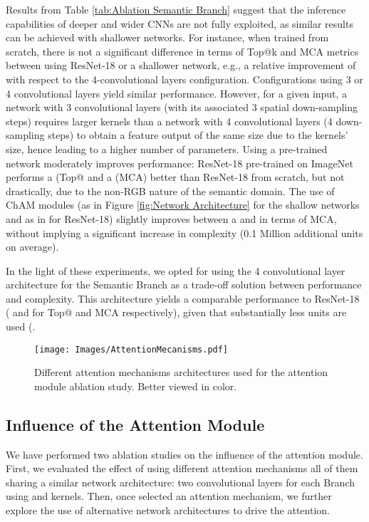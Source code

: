 \documentclass[review, 3p, sort&compress]{elsarticle}
\begin{document}
Results from Table \ref{tab:Ablation Semantic Branch} suggest that the inference capabilities of deeper and wider CNNs are not fully exploited, as similar results can be achieved with shallower networks. For instance, when trained from scratch, there is not a significant difference in terms of Top@k and MCA metrics between using ResNet-18 or a shallower network, e.g., a relative improvement of  with respect to the 4-convolutional layers configuration. Configurations using 3 or 4 convolutional layers yield similar performance. However, for a given input, a network with 3 convolutional layers (with its associated 3 spatial down-sampling steps) requires larger kernels than a network with 4 convolutional layers (4 down-sampling steps) to obtain a feature output of the same size due to the kernels' size, hence leading to a higher number of parameters. Using a pre-trained network moderately improves performance: ResNet-18 pre-trained on ImageNet performs a  (Top@ and a  (MCA) better than ResNet-18 from scratch, but not drastically, due to the non-RGB nature of the semantic domain. The use of ChAM modules (as in Figure \ref{fig:Network Architecture} for the shallow networks and as in \cite{woo2018cbam} for ResNet-18) slightly improves between a  and  in terms of MCA, without implying a significant increase in complexity (0.1 Million additional units on average). 

In the light of these experiments, we opted for using the 4 convolutional layer architecture for the Semantic Branch as a trade-off solution between performance and complexity. This architecture yields a comparable performance to ResNet-18 ( and  for Top@ and MCA respectively), given that substantially less units are used (.

\begin{figure}[t!]
    \centering
    \texttt{[image: Images/AttentionMecanisms.pdf]}
    \caption{Different attention mechanisms architectures used for the attention module ablation study. Better viewed in color.}
    \label{fig:Attention Mechanisms}
\end{figure}

\subsection*{Influence of the Attention Module}
We have performed two ablation studies on the influence of the attention module. First, we evaluated the effect of using different attention mechanisms all of them sharing a similar network architecture: two convolutional layers for each Branch using  and  kernels. Then, once selected an attention mechanism, we further explore the use of alternative network architectures to drive the attention. 
\end{document}
